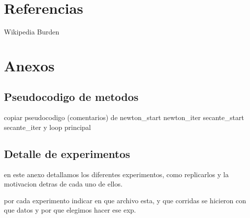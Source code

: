 \documentclass[10pt,a4paper]{article} \usepackage[utf8]{inputenc} %
\begin{document}
\section{Referencias}

Wikipedia
Burden

\section{Anexos}
\subsection{Pseudocodigo de metodos}
copiar pseudocodigo (comentarios) de newton_start newton_iter secante_start
secante_iter y loop principal

\subsection{Detalle de experimentos}

en este anexo detallamos los diferentes experimentos, como replicarlos y la
motivacion detras de cada uno de ellos.

por cada experimento indicar en que archivo esta, y que corridas se hicieron
con que datos y por que elegimos hacer ese exp.
\end{document}
